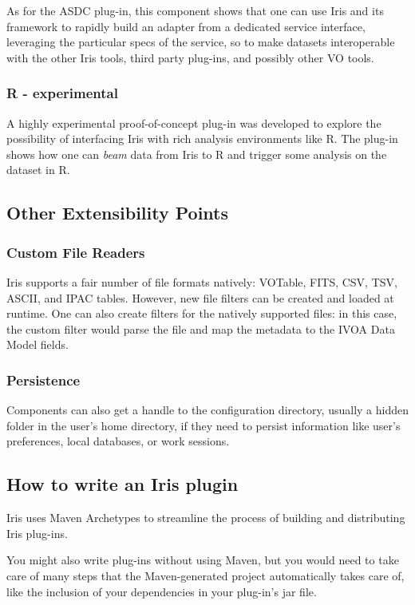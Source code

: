 As for the ASDC plug-in, this component shows that one can use Iris and its framework to rapidly build an adapter from a dedicated service interface, leveraging the particular specs of the service, so to make datasets interoperable with the other Iris tools, third party plug-ins, and possibly other VO tools.

\subsubsection{R - experimental}
A highly experimental proof-of-concept plug-in was developed to explore the possibility of interfacing Iris with rich analysis environments like R. The plug-in shows how one can \emph{beam} data from Iris to R and trigger some analysis on the dataset in R.


\subsection{Other Extensibility Points}

\subsubsection{Custom File Readers}
Iris supports a fair number of ﬁle formats natively: VOTable,
FITS, CSV, TSV, ASCII, and IPAC tables. However, new ﬁle ﬁlters can be created and
loaded at runtime. One can also create ﬁlters for the natively supported ﬁles: in this
case, the custom ﬁlter would parse the ﬁle and map the metadata to the IVOA Data
Model ﬁelds.

\subsubsection{Persistence}
Components can also get a handle to the configuration directory, usually a hidden folder in the user's home directory, if they need to persist information like user's preferences, local databases, or work sessions.



\subsection{How to write an Iris plugin}
\label{sec:writeplugin}
Iris uses Maven Archetypes to streamline the process of building and distributing Iris plug-ins.

You might also write plug-ins without using Maven, but you would need to take care of many steps that the Maven-generated project automatically takes care of, like the inclusion of your dependencies in your plug-in's jar file.

